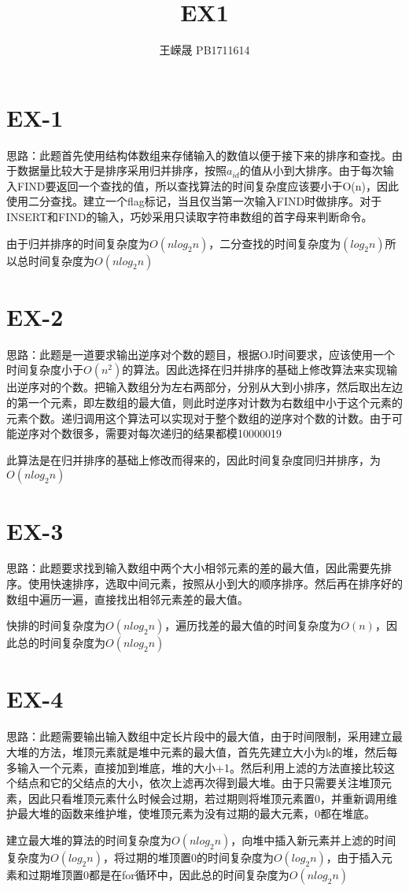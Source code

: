 \documentclass[UTF8]{ctexart}
\title{EX1}
\author{王嵘晟 \quad PB1711614}
\date{}
\begin{document}
	\maketitle
	\section*{EX-1}
	\par{思路：此题首先使用结构体数组来存储输入的数值以便于接下来的排序和查找。由于数据量比较大于是排序采用归并排序，按照$a_{id}$的值从小到大排序。由于每次输入FIND要返回一个查找的值，所以查找算法的时间复杂度应该要小于O(n)，因此使用二分查找。建立一个flag标记，当且仅当第一次输入FIND时做排序。对于INSERT和FIND的输入，巧妙采用只读取字符串数组的首字母来判断命令。}
	\par{由于归并排序的时间复杂度为$O(nlog_{2}n)$，二分查找的时间复杂度为$(log_{2}n)$所以总时间复杂度为$O(nlog_{2}n)$}
	\section*{EX-2}
	\par{思路：此题是一道要求输出逆序对个数的题目，根据OJ时间要求，应该使用一个时间复杂度小于$O(n^{2})$的算法。因此选择在归并排序的基础上修改算法来实现输出逆序对的个数。把输入数组分为左右两部分，分别从大到小排序，然后取出左边的第一个元素，即左数组的最大值，则此时逆序对计数为右数组中小于这个元素的元素个数。递归调用这个算法可以实现对于整个数组的逆序对个数的计数。由于可能逆序对个数很多，需要对每次递归的结果都模10000019}
	\par{此算法是在归并排序的基础上修改而得来的，因此时间复杂度同归并排序，为$O(nlog_{2}n)$}
	\section*{EX-3}
	\par{思路：此题要求找到输入数组中两个大小相邻元素的差的最大值，因此需要先排序。使用快速排序，选取中间元素，按照从小到大的顺序排序。然后再在排序好的数组中遍历一遍，直接找出相邻元素差的最大值。}
	\par{快排的时间复杂度为$O(nlog_{2}n)$，遍历找差的最大值的时间复杂度为$O(n)$，因此总的时间复杂度为$O(nlog_{2}n)$}
	\section*{EX-4}
	\par{思路：此题需要输出输入数组中定长片段中的最大值，由于时间限制，采用建立最大堆的方法，堆顶元素就是堆中元素的最大值，首先先建立大小为k的堆，然后每多输入一个元素，直接加到堆底，堆的大小+1。然后利用上滤的方法直接比较这个结点和它的父结点的大小，依次上滤再次得到最大堆。由于只需要关注堆顶元素，因此只看堆顶元素什么时候会过期，若过期则将堆顶元素置0，并重新调用维护最大堆的函数来维护堆，使堆顶元素为没有过期的最大元素，0都在堆底。}
	\par{建立最大堆的算法的时间复杂度为$O(nlog_{2}n)$，向堆中插入新元素并上滤的时间复杂度为$O(log_{2}n)$，将过期的堆顶置0的时间复杂度为$O(log_{2}n)$，由于插入元素和过期堆顶置0都是在for循环中，因此总的时间复杂度为$O(nlog_{2}n)$}
\end{document}
